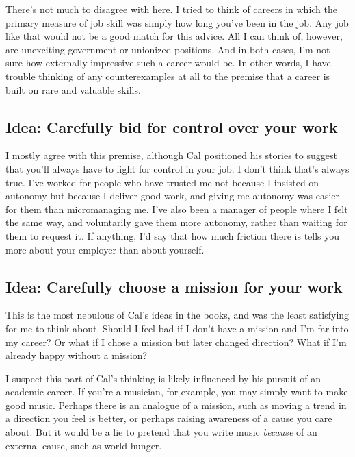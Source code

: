 \documentclass[
]{article}
\begin{document}
There's not much to disagree with here. I tried to think of careers in
which the primary measure of job skill was simply how long you've been
in the job. Any job like that would not be a good match for this advice.
All I can think of, however, are unexciting government or unionized
positions. And in both cases, I'm not sure how externally impressive
such a career would be. In other words, I have trouble thinking of any
counterexamples at all to the premise that a career is built on rare and
valuable skills.

\hypertarget{idea-carefully-bid-for-control-over-your-work}{%
\subsection{Idea: Carefully bid for control over your
work}\label{idea-carefully-bid-for-control-over-your-work}}

I mostly agree with this premise, although Cal positioned his stories to
suggest that you'll always have to fight for control in your job. I
don't think that's always true. I've worked for people who have trusted
me not because I insisted on autonomy but because I deliver good work,
and giving me autonomy was easier for them than micromanaging me. I've
also been a manager of people where I felt the same way, and voluntarily
gave them more autonomy, rather than waiting for them to request it. If
anything, I'd say that how much friction there is tells you more about
your employer than about yourself.

\hypertarget{idea-carefully-choose-a-mission-for-your-work}{%
\subsection{Idea: Carefully choose a mission for your
work}\label{idea-carefully-choose-a-mission-for-your-work}}

This is the most nebulous of Cal's ideas in the books, and was the least
satisfying for me to think about. Should I feel bad if I don't have a
mission and I'm far into my career? Or what if I chose a mission but
later changed direction? What if I'm already happy without a mission?

I suspect this part of Cal's thinking is likely influenced by his
pursuit of an academic career. If you're a musician, for example, you
may simply want to make good music. Perhaps there is an analogue of a
mission, such as moving a trend in a direction you feel is better, or
perhaps raising awareness of a cause you care about. But it would be a
lie to pretend that you write music \emph{because} of an external cause,
such as world hunger.
\end{document}
